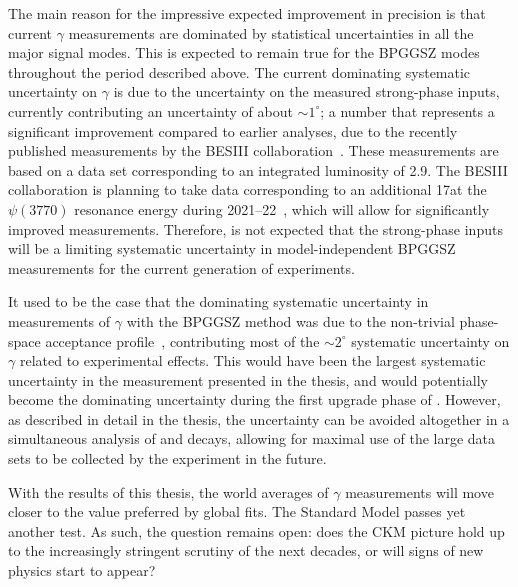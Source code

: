 The main reason for the impressive expected improvement in precision is that current $\gamma$ measurements are dominated by statistical uncertainties in all the major signal modes. This is expected to remain true for the BPGGSZ modes throughout the period described above. The current dominating systematic uncertainty on $\gamma$ is due to the uncertainty on the measured strong-phase inputs, currently contributing an uncertainty of about $\sim1^\circ$; a number that represents a significant improvement compared to earlier analyses, due to the recently published measurements by the BESIII collaboration~\cite{BESCISI,BESCISIKSKK}. These measurements are based on a data set corresponding to an integrated luminosity of 2.9\invfb. The BESIII collaboration is planning to take data corresponding to an additional 17\invfb at the $\psi(3770)$ resonance energy during 2021--22~\cite{BESTimescale}, which will allow for significantly improved measurements. Therefore, is not expected that the strong-phase inputs will be a limiting systematic uncertainty in model-independent BPGGSZ measurements for the current generation of experiments. 

It used to be the case that the dominating systematic uncertainty in \lhcb measurements of $\gamma$ with the BPGGSZ method was due to the non-trivial phase-space acceptance profile~\cite{LHCb-PAPER-2018-017}, contributing most of the $\sim2^\circ$ systematic uncertainty on $\gamma$ related to experimental effects. This would have been the largest systematic uncertainty in the measurement presented in the thesis, and would potentially become the dominating uncertainty during the first upgrade phase of \lhcb. However, as described in detail in the thesis, the uncertainty can be avoided altogether in a simultaneous analysis of \BtoDK and \BtoDpi decays, allowing for maximal use of the large data sets to be collected by the \lhcb experiment in the future.

With the results of this thesis, the world averages of $\gamma$ measurements will move closer to the value preferred by global fits. The Standard Model passes yet another test. As such, the question remains open: does the CKM picture hold up to the increasingly stringent scrutiny of the next decades, or will signs of new physics start to appear?





